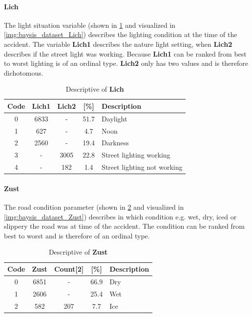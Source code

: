 \paragraph{Lich}
\label{baysis_dataset_Lich}
The light situation variable (shown in \cref{tbl:baysis_dataset_Lich} and visualized in \cref{img:baysis_dataset_Lich}) describes the lighting condition at the time of the accident. The variable \textbf{Lich1} describes the nature light setting, when \textbf{Lich2} describes if the street light was working. Because \textbf{Lich1} can be ranked from best to worst lighting is of an ordinal type. \textbf{Lich2} only has two values and is therefore dichotomous.
\begin{table}[ht]
	\centering
	\small
	\begin{tabular}{c|c|c|c|l}
		\toprule
		Code & \textbf{Lich1} & \textbf{Lich2} & [\%] & Description \\ 
		\midrule 
		0 & 6833 	& - 	& 51.7 & Daylight \\
		1 & 627 	& -		& 4.7  & Noon \\
		2 & 2560	& - 	& 19.4 & Darkness \\
		3 & - 		& 3005	& 22.8 & Street lighting working \\
		4 & - 		& 182	& 1.4  & Street lighting not working \\
		\bottomrule
	\end{tabular}
	\caption{Descriptive of \textbf{Lich}}
	\label{tbl:baysis_dataset_Lich}
	\vspace{-8mm}
\end{table} 
\paragraph{Zust}
\label{baysis_dataset_Zust}
The road condition parameter (shown in \cref{tbl:baysis_dataset_Zust} and visualized in \cref{img:baysis_dataset_Zust}) describes in which condition e.g. wet, dry, iced or slippery the road was at time of the accident. The condition can be ranked from best to worst and is therefore of an ordinal type.
\begin{table}[ht]
	\centering
	\small
	\begin{tabular}{c|c|c|c|l}
		\toprule
		Code & \textbf{Zust} & Count[2] & [\%] & Description \\ 
		\midrule 
		0 & 6851 	& -		& 66.9 & Dry \\ 
 		1 & 2606	& -		& 25.4 & Wet \\ 
 		2 & 582		& 207	& 7.7  & Ice \\
	\end{tabular}
	\caption{Descriptive of \textbf{Zust}}
	\label{tbl:baysis_dataset_Zust}
	\vspace{-8mm}
\end{table}
